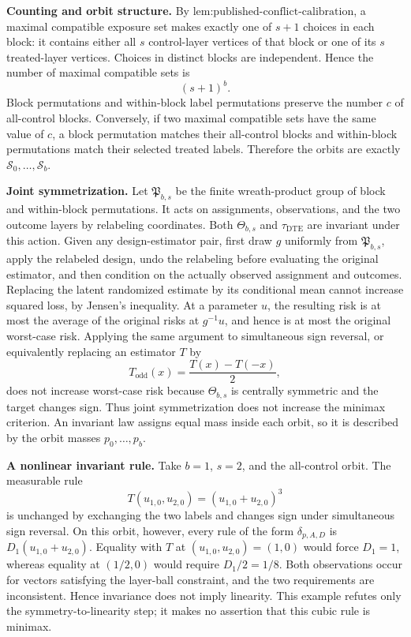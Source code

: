 \textbf{Counting and orbit structure.} By \(\text{lem:published-conflict-calibration}\), a maximal compatible exposure set makes exactly one of \(s+1\) choices in each block: it contains either all \(s\) control-layer vertices of that block or one of its \(s\) treated-layer vertices. Choices in distinct blocks are independent. Hence the number of maximal compatible sets is
\[
(s+1)^b.
\]
Block permutations and within-block label permutations preserve the number \(c\) of all-control blocks. Conversely, if two maximal compatible sets have the same value of \(c\), a block permutation matches their all-control blocks and within-block permutations match their selected treated labels. Therefore the orbits are exactly \(\mathcal S_0,\ldots,\mathcal S_b\).

\textbf{Joint symmetrization.} Let \(\mathfrak P_{b,s}\) be the finite wreath-product group of block and within-block permutations. It acts on assignments, observations, and the two outcome layers by relabeling coordinates. Both \(\Theta_{b,s}\) and \(\tau_{\mathrm{DTE}}\) are invariant under this action. Given any design-estimator pair, first draw \(g\) uniformly from \(\mathfrak P_{b,s}\), apply the relabeled design, undo the relabeling before evaluating the original estimator, and then condition on the actually observed assignment and outcomes. Replacing the latent randomized estimate by its conditional mean cannot increase squared loss, by Jensen's inequality. At a parameter \(u\), the resulting risk is at most the average of the original risks at \(g^{-1}u\), and hence is at most the original worst-case risk. Applying the same argument to simultaneous sign reversal, or equivalently replacing an estimator \(T\) by
\[
T_{\mathrm{odd}}(x)=\frac{T(x)-T(-x)}2,
\]
does not increase worst-case risk because \(\Theta_{b,s}\) is centrally symmetric and the target changes sign. Thus joint symmetrization does not increase the minimax criterion. An invariant law assigns equal mass inside each orbit, so it is described by the orbit masses \(p_0,\ldots,p_b\).

\textbf{A nonlinear invariant rule.} Take \(b=1\), \(s=2\), and the all-control orbit. The measurable rule
\[
T(u_{1,0},u_{2,0})=(u_{1,0}+u_{2,0})^3
\]
is unchanged by exchanging the two labels and changes sign under simultaneous sign reversal. On this orbit, however, every rule of the form \(\delta_{p,A,D}\) is \(D_1(u_{1,0}+u_{2,0})\). Equality with \(T\) at \((u_{1,0},u_{2,0})=(1,0)\) would force \(D_1=1\), whereas equality at \((1/2,0)\) would require \(D_1/2=1/8\). Both observations occur for vectors satisfying the layer-ball constraint, and the two requirements are inconsistent. Hence invariance does not imply linearity. This example refutes only the symmetry-to-linearity step; it makes no assertion that this cubic rule is minimax.